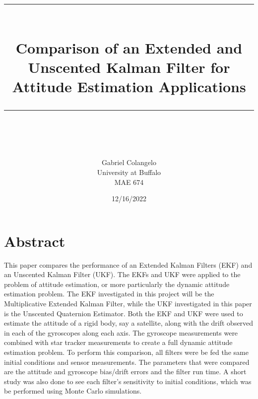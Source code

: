 \documentclass[12pt]{report}
\newcommand{\HRule}[1]{\rule{\linewidth}{#1}}
\begin{document}
\title{ \normalsize \textsc{ }
		\\ [2.0cm]
		\HRule{0.5pt} \\
		\LARGE \textbf{Comparison of an Extended and Unscented Kalman Filter for Attitude Estimation Applications}
		\HRule{2pt} \\ [0.5cm]
		\normalsize  \vspace*{5\baselineskip}}



\author{Gabriel Colangelo \\ 
		University at Buffalo \\
		MAE 674} 
\date {12/16/2022}

\maketitle
\tableofcontents
\newpage

\sectionfont{\scshape}

\newpage
\section*{Abstract}
\noindent This paper compares the performance of an Extended Kalman Filters (EKF) and an Unscented Kalman Filter (UKF). The EKFs and UKF were applied to the problem of attitude estimation, or more particularly the dynamic attitude estimation problem. The EKF investigated in this project will be the Multiplicative Extended Kalman Filter, while the UKF investigated in this paper is the Unscented Quaternion Estimator. Both the EKF and UKF were used to estimate the attitude of a rigid body, say a satellite, along with the drift observed in each of the gyroscopes along each axis. The gyroscope measurements were combined with star tracker measurements to create a full dynamic attitude estimation problem. To perform this comparison, all filters were be fed the same initial conditions and sensor measurements. The parameters that were compared are the attitude and gyroscope bias/drift errors and the filter run time. A short study was also done to see each filter’s sensitivity to initial conditions, which was be performed using Monte Carlo simulations.
\end{document}
